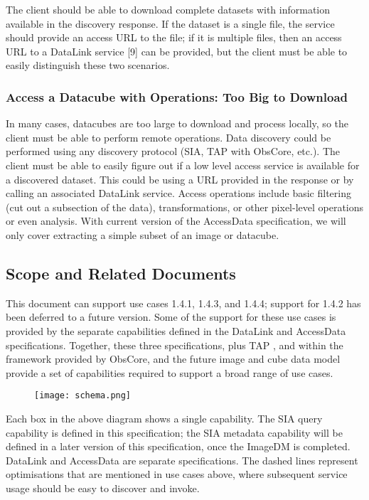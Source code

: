 \documentclass[11pt,a4paper]{ivoa}
\begin{document}
The client should be able to download complete datasets with information available in the discovery response. If the dataset is a single file, the service should provide an access URL to the file; if it is multiple files, then an access URL to a DataLink service [9] can be provided, but the client must be able to easily distinguish these two scenarios.

\subsubsection{Access a Datacube with Operations: Too Big to Download}
\label{sec:async}
In many cases, datacubes are too large to download and process locally, so the client must be able to perform remote operations. Data discovery could be performed using any discovery protocol (SIA, TAP with ObsCore, etc.).  The client must be able to easily figure out if a low level access service is available for a discovered dataset. This could be using a URL provided in the response or by calling an associated DataLink service. Access operations include basic filtering (cut out a subsection of the data), transformations, or other pixel-level operations or even analysis. With current  version of the AccessData specification, we will only cover extracting a simple subset of an image or datacube.

\subsection{Scope and Related Documents}
\label{sec:examples}

This document can  support use cases 1.4.1, 1.4.3, and 1.4.4; support for 1.4.2 has been deferred to a future version. Some of the support for these use cases is provided by the separate capabilities defined in the DataLink and AccessData specifications. Together, these three specifications, plus TAP \citep{2019ivoa.spec.0927D}, and  within the framework provided by ObsCore, and the future image and cube data model provide a set of capabilities required to support a broad range of use cases.


\begin{figure}[H]
\centering

\texttt{[image: schema.png]}
\label{fig:schema}
\end{figure}


Each box in the above diagram shows a single capability. The SIA query capability is defined in this specification; the SIA metadata capability will be defined in a later version of this specification, once the ImageDM is completed. DataLink  and AccessData are separate specifications. The dashed lines represent optimisations that are mentioned in use cases above, where subsequent service usage should be easy to discover and invoke.
\end{document}
